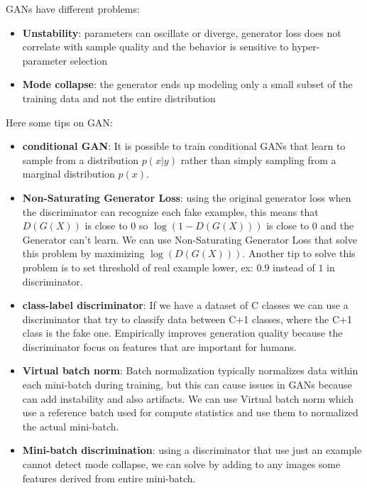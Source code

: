 GANs have different problems:
\begin{itemize}
    \item \textbf{Unstability}: parameters can oscillate or diverge, generator
          loss does not correlate with sample quality and the behavior is sensitive to
          hyper-parameter selection
    \item \textbf{Mode collapse}: the generator ends up modeling only a small
          subset of the training data and not the entire distribution
\end{itemize}

Here some tips on GAN:
\begin{itemize}
    \item \textbf{conditional GAN}: It is possible to train conditional GANs that learn
          to sample from a distribution $p(x | y)$ rather than simply sampling from a
          marginal distribution $p(x)$.
    \item \textbf{Non-Saturating Generator Loss}: using the original generator loss
          when the discriminator can recognize each fake examples, this means that
          $D(G(X))$ is close to $0$ so $\log(1-D(G(X)))$ is close to 0 and the Generator
          can't learn. We can use Non-Saturating Generator Loss that solve this problem
          by maximizing $\log(D(G(X)))$. Another tip to solve this problem is to set
          threshold of real example lower, ex: $0.9$ instead of $1$ in discriminator.
    \item \textbf{class-label discriminator}: If we have a dataset of C classes
          we can use a discriminator that try to classify data between C+1 classes, where
          the C+1 class is the fake one. Empirically improves generation quality because
          the discriminator focus on features that are important for humans.
    \item \textbf{Virtual batch norm}: Batch normalization typically normalizes
          data within each mini-batch during training, but this can cause issues in GANs
          because can add instability and also artifacts. We can use Virtual batch norm
          which use a reference batch used for compute statistics and use them to normalized
          the actual mini-batch.
    \item \textbf{Mini-batch discrimination}: using a discriminator that use just
          an example cannot detect mode collapse, we can solve by adding to any
          images some features derived from entire mini-batch.
\end{itemize}

